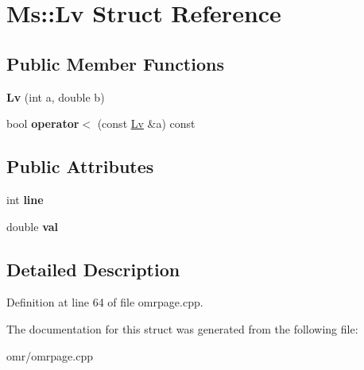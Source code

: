 \hypertarget{struct_ms_1_1_lv}{}\section{Ms\+:\+:Lv Struct Reference}
\label{struct_ms_1_1_lv}
\subsection*{Public Member Functions}
\begin{DoxyCompactItemize}
\item 
\mbox{\label{struct_ms_1_1_lv_a36d94db9af41be45a438b48317de97d0}} 
{\bfseries Lv} (int a, double b)
\item 
\mbox{\label{struct_ms_1_1_lv_a9360b6c42d06001b3307eed5655b3cec}} 
bool {\bfseries operator$<$} (const \hyperlink{struct_ms_1_1_lv}{Lv} \&a) const
\end{DoxyCompactItemize}
\subsection*{Public Attributes}
\begin{DoxyCompactItemize}
\item 
\mbox{\label{struct_ms_1_1_lv_adfe61dca0003ec00d1ab136ab1730e48}} 
int {\bfseries line}
\item 
\mbox{\label{struct_ms_1_1_lv_a45e84c6f651fe4c31e980977f6aa31cb}} 
double {\bfseries val}
\end{DoxyCompactItemize}


\subsection{Detailed Description}


Definition at line 64 of file omrpage.\+cpp.



The documentation for this struct was generated from the following file\+:\begin{DoxyCompactItemize}
\item 
omr/omrpage.\+cpp\end{DoxyCompactItemize}
